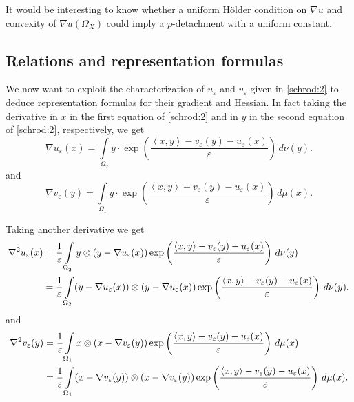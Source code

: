 \documentclass[reqno,12pt]{article}
\newcommand{\inner}[2]{\left\langle #1, #2 \right\rangle}
\newcommand{\I}{\int\limits}
\begin{document}
\begin{oss}
It would be interesting to know whether a uniform H\"{o}lder condition on $\nabla u$ and convexity of $\nabla u (\Omega_X)$ could imply a $p$-detachment with a uniform constant.
\end{oss}

\subsection{Relations and representation formulas}
\label{subs:repres}

We now want to exploit the characterization of $u_{\varepsilon}$ and $v_{\varepsilon}$ given in \eqref{schrod:2} to deduce representation formulas for their gradient and Hessian. In fact taking the derivative in $x$ in the first equation of \eqref{schrod:2} and in $y$ in the second equation of \eqref{schrod:2}, respectively, we get
\begin{equation}
\label{eq:1st:1} 
\nabla u_{\varepsilon}(x)  = \I_{\Omega_2} y \cdot  \exp\left(\frac{\inner{x}{y}-v_{\varepsilon}(y)-u_{\varepsilon}(x)}{\varepsilon}\right)\,d\nu(y).
\end{equation}
and 
\begin{equation}
\label{eq:1st:2} 
\nabla v_{\varepsilon}(y)  = \I_{\Omega_1} y \cdot  \exp\left(\frac{\inner{x}{y}-v_{\varepsilon}(y)-u_{\varepsilon}(x)}{\varepsilon}\right)\,d\mu(x).
\end{equation}

Taking another derivative we get
\begin{align} \nabla^2 u_{\varepsilon}(x) &=\frac 1{\varepsilon} \I_{\Omega_2} y  \otimes (y- \nabla u_{\varepsilon}(x)) \exp \left(\frac{\inner{x}{y}-v_{\varepsilon}(y)-u_{\varepsilon}(x)}{\varepsilon}\right)\,d\nu(y) \notag\\
&  \label{eq:2nd:1}  = \frac 1{\varepsilon} \I_{\Omega_2} (y- \nabla u_{\varepsilon}(x))  \otimes (y- \nabla u_{\varepsilon}(x)) \exp \left(\frac{\inner{x}{y}-v_{\varepsilon}(y)-u_{\varepsilon}(x)}{\varepsilon}\right)\,d\nu(y).
\end{align}
and 
\begin{align} \nabla^2 v_{\varepsilon}(y) &=\frac 1{\varepsilon} \I_{\Omega_1} x  \otimes (x- \nabla v_{\varepsilon}(y)) \exp \left(\frac{\inner{x}{y}-v_{\varepsilon}(y)-u_{\varepsilon}(x)}{\varepsilon}\right)\,d\mu(x) \notag\\
&  \label{eq:2nd:2}  = \frac 1{\varepsilon} \I_{\Omega_1} (x- \nabla v_{\varepsilon}(y))  \otimes (x- \nabla v_{\varepsilon}(y)) \exp \left(\frac{\inner{x}{y}-v_{\varepsilon}(y)-u_{\varepsilon}(x)}{\varepsilon}\right)\,d\mu(x).
\end{align}
\end{document}
